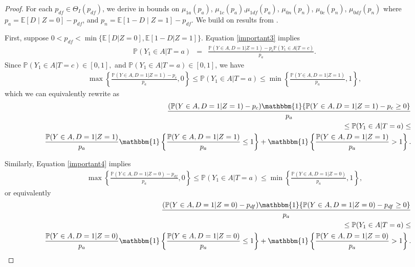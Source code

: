 \documentclass[12pt]{article}
\theoremstyle{plain}
\theoremstyle{definition}
\theoremstyle{remark}
\begin{document}
\begin{proof}

For each $p_{df} \in \Theta_I(p_{df})$, we derive in bounds on $\mu_{1a}(p_a)$, $\mu_{1c}(p_a)$,$\mu_{1df}(p_a)$, $\mu_{0n}(p_n)$, $\mu_{0c}(p_n)$, $\mu_{0df}(p_n)$ where $p_a=\mathbb{E}[D \mid Z=0]-p_{d f}$, and $p_n =\mathbb{E}[1-D \mid Z=1]-p_{d f}$. We build on results from \cite{Horowitz1995IdentificationData}. 


First, suppose $0 < p_{df} < \min\{\mathbb E[D\vert Z=0], \mathbb E[1-D \vert Z=1]\}$.
Equation \eqref{important3} implies 
\begin{eqnarray*}
    \mathbb P(Y_1 \in A \vert T=a) &=& \frac{\mathbb P(Y\in A, D=1 \vert Z=1)- p_c \mathbb P(Y_1 \in A \vert T=c)}{p_a}.
\end{eqnarray*}
Since $\mathbb P(Y_1 \in A \vert T=c) \in [0,1],$ and $\mathbb P(Y_1 \in A \vert T=a) \in [0,1]$, we have
\begin{eqnarray*}
   \max\left\{\frac{\mathbb P(Y\in A, D=1 \vert Z=1)- p_c}{p_a},0\right\} \leq \mathbb P(Y_1 \in A \vert T=a) \leq \min\left\{\frac{\mathbb P(Y\in A, D=1 \vert Z=1)}{p_a},1\right\},  
   \end{eqnarray*}
which we can equivalently rewrite as 
\begin{eqnarray*}
   && \frac{(\mathbb P(Y\in A, D=1 \vert Z=1)- p_c)\mathbbm{1}\{\mathbb P(Y\in A, D=1 \vert Z=1)- p_c\geq 0\}}{p_a}\\
   && \qquad \qquad \leq \mathbb P(Y_1 \in A \vert T=a) \leq \\
   && \frac{\mathbb P(Y\in A, D=1 \vert Z=1)}{p_a}\mathbbm{1}\left\{\frac{\mathbb P(Y\in A, D=1 \vert Z=1)}{p_a} \leq 1\right\}+\mathbbm{1}\left\{\frac{\mathbb P(Y\in A, D=1 \vert Z=1)}{p_a} > 1\right\}.  
\end{eqnarray*}

   
Similarly, Equation \eqref{important4} implies
\begin{eqnarray*}
   \max\left\{\frac{\mathbb P(Y\in A, D=1 \vert Z=0)- p_{df}}{p_a},0\right\} \leq \mathbb P(Y_1 \in A \vert T=a) \leq \min\left\{\frac{\mathbb P(Y\in A, D=1 \vert Z=0)}{p_a},1\right\},   
   \end{eqnarray*}
or equivalently
\begin{eqnarray*}
   && \frac{(\mathbb P(Y\in A, D=1 \vert Z=0)- p_{df})\mathbbm{1}\{\mathbb P(Y\in A, D=1 \vert Z=0)- p_{df}\geq 0\}}{p_a}\\
   && \qquad \qquad \leq \mathbb P(Y_1 \in A \vert T=a) \leq \\
   && \frac{\mathbb P(Y\in A, D=1 \vert Z=0)}{p_a}\mathbbm{1}\left\{\frac{\mathbb P(Y\in A, D=1 \vert Z=0)}{p_a} \leq 1\right\}+\mathbbm{1}\left\{\frac{\mathbb P(Y\in A, D=1 \vert Z=0)}{p_a} > 1\right\}.  
\end{eqnarray*}
   

\end{proof}
\end{document}
